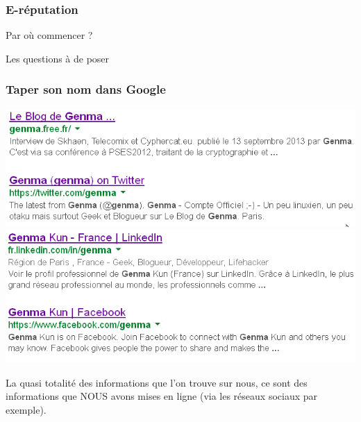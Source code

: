 \documentclass{beamer}
\begin{document}
\begin{frame}
\frametitle{E-réputation}

\begin{block}{Par où commencer ?}
\begin{itemize}
\end{itemize}
\end{block}

\begin{block}{Les questions à de poser}
\begin{itemize}
\end{itemize}
\end{block}
\end{frame}
\begin{frame}
\frametitle{Taper son nom dans Google}
\begin{center}
\includegraphics[scale=0.5] {./images/Google01.png} 
\includegraphics[scale=0.5] {./images/Google02.png} 
\end{center}
\end{frame}
\begin{frame}
\huge{
La quasi totalité des informations que l'on trouve sur nous, ce sont des informations que NOUS avons mises en ligne (via les réseaux sociaux par exemple).}
\end{frame}
\end{document}
